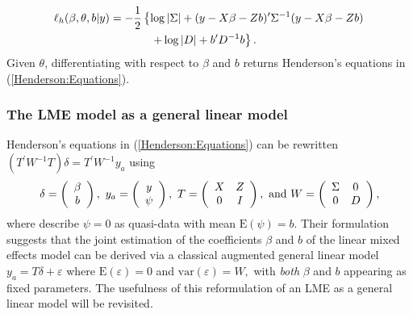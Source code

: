 \documentclass[12pt, a4paper]{report}
\theoremstyle{plain}
\theoremstyle{definition}
\theoremstyle{remark}
\begin{document}
\begin{eqnarray*}
\ell_h(\beta,\theta,b|y)
& = \displaystyle -\frac{1}{2} \left\{ \log|\Sigma| + (y - X \beta -Zb)'\Sigma^{-1}( y - X \beta -Zb) \right.\\
&  \hspace{0.5in} \left. + \log|D| + b^\prime D^{-1}b \right\}.
\end{eqnarray*}
Given $\theta$, differentiating with respect to $\beta$ and $b$ returns Henderson's equations in (\ref{Henderson:Equations}).

\subsubsection{The LME model as a general linear model}
Henderson's equations in (\ref{Henderson:Equations}) can be rewritten $( T^\prime W^{-1} T ) \delta = T^\prime W^{-1} y_{a} $ using
\[
\delta = \left(\begin{array}{c}\beta \\ b \end{array}\right),
\ y_{a} = \left(\begin{array}{c}
y \cr \psi
\end{array}\right),
\ T = \left(\begin{array}{cc}
X & Z  \\
0 & I
\end{array}\right),
\ \textrm{and} \ W = \left(\begin{array}{cc}
\Sigma & 0  \cr
0 &  D \end{array}\right),
\]
where \cite{YLee} describe $\psi = 0$ as quasi-data with mean $\mathrm{E}(\psi) = b.$ Their formulation suggests that the joint estimation of the coefficients $\beta$ and $b$ of the linear mixed effects model can be derived via a classical augmented general linear model $y_{a} = T\delta + \varepsilon$ where $\mathrm{E}(\varepsilon) = 0$ and $\mathrm{var}(\varepsilon) = W,$ with \emph{both} $\beta$ and $b$ appearing as fixed parameters. The usefulness of this reformulation of an LME as a general linear model will be revisited.


%
\end{document}
